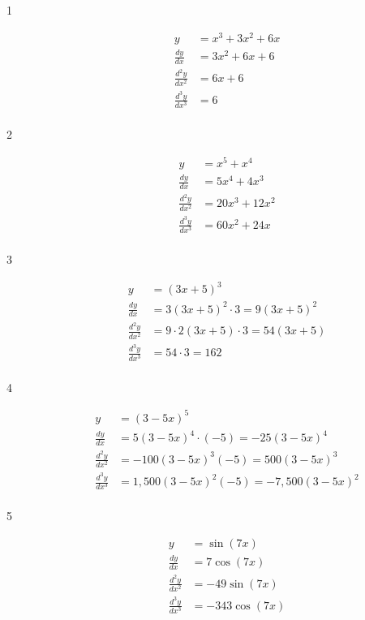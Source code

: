 \documentclass{exam}
\begin{document}
\begin{description}
\item[1]
\begin{align*}
  y &= x^3 + 3x^2 + 6x \\
  \frac{dy}{dx} &= 3x^2 + 6x + 6 \\
  \frac{d^2y}{dx^2} &= 6x + 6 \\
  \frac{d^3y}{dx^3} &= 6 \\
\end{align*}

\item[2]
\begin{align*}
  y &= x^5 + x^4 \\
  \frac{dy}{dx} &= 5x^4 + 4x^3 \\
  \frac{d^2y}{dx^2} &= 20x^3 + 12x^2 \\
  \frac{d^3y}{dx^3} &= 60x^2 + 24x \\
\end{align*}

\item[3]
\begin{align*}
  y &= (3x + 5)^3 \\
  \frac{dy}{dx} &= 3(3x + 5)^2 \cdot 3 = 9(3x+5)^2 \\
  \frac{d^2y}{dx^2} &= 9 \cdot 2 (3x+5) \cdot 3 = 54(3x+5) \\
  \frac{d^3y}{dx^3} &= 54 \cdot 3 = 162 \\
\end{align*}

\item[4]
\begin{align*}
  y &= (3 - 5x)^5 \\
  \frac{dy}{dx} &= 5(3 - 5x)^4 \cdot (-5) = -25 (3 - 5x)^4 \\
  \frac{d^2y}{dx^2} &= -100 (3 - 5x)^3(-5) = 500(3 - 5x)^3 \\
  \frac{d^3y}{dx^3} &= 1,500 (3 - 5x)^2 (-5) = -7,500 (3 - 5x)^2 \\
\end{align*}

\item[5]
\begin{align*}
  y &= \sin(7x) \\
  \frac{dy}{dx} &= 7 \cos(7x) \\
  \frac{d^2y}{dx^2} &= -49 \sin(7x) \\
  \frac{d^3y}{dx^3} &= -343 \cos(7x) \\
\end{align*}


\end{description}
\end{document}
